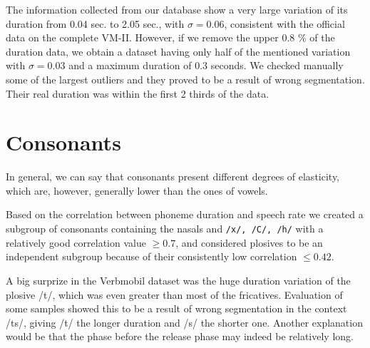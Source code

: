 \documentclass[11pt,a4paper]{scrbook}
\begin{document}
The information collected from our database show a very large variation of its duration from 0.04 sec. to 2.05 sec., with $\sigma = 0.06$, consistent with the official data on the complete VM-II. However, if we remove the upper 0.8 \% of the duration data, we obtain a dataset having only half of the mentioned variation with $\sigma = 0.03$ and a maximum duration of 0.3 seconds. We checked manually some of the largest outliers and they proved to be a result of wrong segmentation. Their real duration was within the first 2 thirds of the data.

\section{Consonants}
\label{cons}
In general, we can say that consonants present different degrees of elasticity, which are, however, generally lower than the ones of vowels.

Based on the correlation between phoneme duration and speech rate we created a subgroup of consonants containing the nasals and \texttt{/x/, /C/, /h/} with a relatively good correlation value $\geq 0.7$, and considered plosives to be an independent subgroup because of their consistently low correlation $\leq 0.42$.

A big surprize in the Verbmobil dataset was the huge duration variation of the plosive /t/, which was even greater than most of the fricatives. Evaluation of some samples showed this to be a result of wrong segmentation in the context /ts/, giving /t/ the longer duration and /s/ the shorter one. Another explanation would be that the phase before the release phase may indeed be relatively long.
\end{document}
